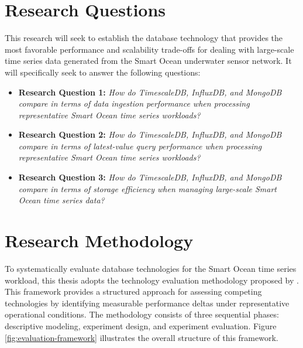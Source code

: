 \section{Research Questions}
This research will seek to establish the database technology that provides the most favorable performance and scalability trade-offs for dealing with large-scale time series data generated from the Smart Ocean underwater sensor network. It will specifically seek to answer the following questions:
\begin{itemize}
      \item \textbf{Research Question 1:} \emph{How do TimescaleDB, InfluxDB, and MongoDB compare in terms of data ingestion performance when processing representative Smart Ocean time series workloads? }
      
      \item \textbf{Research Question 2:} \emph{How do TimescaleDB, InfluxDB, and MongoDB compare in terms of latest-value query performance when processing representative Smart Ocean time series workloads? }
      
      \item \textbf{Research Question 3:} \emph{How do TimescaleDB, InfluxDB, and MongoDB compare in terms of storage efficiency when managing large-scale Smart Ocean time series data?}
\end{itemize}


\section{Research Methodology}

To systematically evaluate database technologies for the Smart Ocean time series workload, this thesis adopts the technology evaluation methodology proposed by \citet{Brown_1996}. This framework provides a structured approach for assessing competing technologies by identifying measurable performance deltas under representative operational conditions. The methodology consists of three sequential phases: descriptive modeling, experiment design, and experiment evaluation.  Figure \ref{fig:evaluation-framework}  illustrates the overall structure of this framework.

